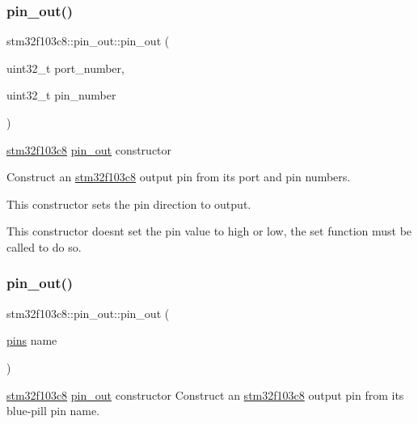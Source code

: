 \subsubsection{\texorpdfstring{pin\+\_\+out()}{pin\_out()}\hspace{0.1cm}{\footnotesize\ttfamily [1/2]}}
{\footnotesize\ttfamily stm32f103c8\+::pin\+\_\+out\+::pin\+\_\+out (\begin{DoxyParamCaption}\item[{uint32\+\_\+t}]{port\+\_\+number,  }\item[{uint32\+\_\+t}]{pin\+\_\+number }\end{DoxyParamCaption})\hspace{0.3cm}{\ttfamily [inline]}}

\hyperlink{namespacestm32f103c8}{stm32f103c8} \hyperlink{classstm32f103c8_1_1pin__out}{pin\+\_\+out} constructor

Construct an \hyperlink{namespacestm32f103c8}{stm32f103c8} output pin from its port and pin numbers.

This constructor sets the pin direction to output.

This constructor doesn\textquotesingle{}t set the pin value to high or low, the set function must be called to do so. \mbox{\label{classstm32f103c8_1_1pin__out_ad226a64af3c8204040694b8d8c634b1d}} 
\subsubsection{\texorpdfstring{pin\+\_\+out()}{pin\_out()}\hspace{0.1cm}{\footnotesize\ttfamily [2/2]}}
{\footnotesize\ttfamily stm32f103c8\+::pin\+\_\+out\+::pin\+\_\+out (\begin{DoxyParamCaption}\item[{\hyperlink{namespacestm32f103c8_a69d642506db309a7e64295d35ec21ff6}{pins}}]{name }\end{DoxyParamCaption})\hspace{0.3cm}{\ttfamily [inline]}}

\hyperlink{namespacestm32f103c8}{stm32f103c8} \hyperlink{classstm32f103c8_1_1pin__out}{pin\+\_\+out} constructor Construct an \hyperlink{namespacestm32f103c8}{stm32f103c8} output pin from its blue-\/pill pin name.

